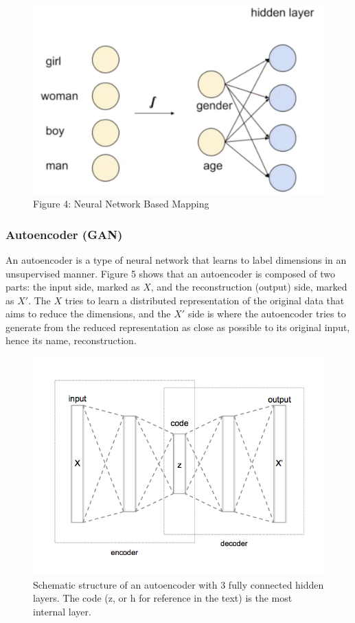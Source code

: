 \documentclass[paper=a4, fontsize=12pt]{scrartcl}
\begin{document}
\begin{figure}
  \includegraphics[width=\linewidth]{nnlm.png}
  \caption{Figure 4: Neural Network Based Mapping}
  \label{fig:nnlm}
\end{figure}
\subsubsection{Autoencoder (GAN)}
An autoencoder is a type of neural network that learns to label dimensions in an unsupervised manner. Figure 5 shows that an autoencoder is composed of two parts: the input side, marked as $X$, and the reconstruction (output) side, marked as $X'$. The $X$ tries to learn a distributed representation of the original data that aims to reduce the dimensions, and the $X'$ side is where the autoencoder tries to generate from the reduced representation as close as possible to its original input, hence its name, reconstruction. 
\begin{figure}
  \includegraphics[width=\linewidth]{Autoencoder_structure.png}
  \caption{Schematic structure of an autoencoder with 3 fully connected hidden layers. The code (z, or h for reference in the text) is the most internal layer.}
  \label{fig:autoencoder}
\end{figure}
\end{document}
